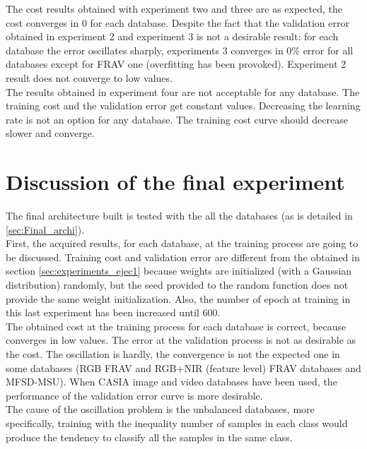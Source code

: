 The cost results obtained with experiment two and three are as expected, the cost converges in 0 for each database. Despite the fact that the validation error obtained in experiment 2 and experiment 3 is not a desirable result: for each database the error oscillates sharply, experiments 3 converges in 0\% error for all databases except for FRAV one (overfitting has been provoked). Experiment 2 result does not converge to low values.\\

The results obtained in experiment four are not acceptable for any database. The training cost and the validation error get constant values. Decreasing the learning rate is not an option for any database. The training cost curve should decrease slower and converge.\\

\section{Discussion of the final experiment}
The final architecture built is tested with the all the databases (as is detailed in \ref{sec:Final_archi}).\\

First, the acquired results, for each database, at the training process are going to be discussed. Training cost and validation error are different from the obtained in section \ref{sec:experiments_ejec1} because weights are initialized (with a Gaussian distribution) randomly, but the seed provided to the random function does not provide the same weight initialization. Also, the number of epoch at training in this last experiment has been increased until 600.\\

The obtained cost at the training process for each database is correct, because converges in low values. The error at the validation process is not as desirable as the cost. The oscillation is hardly, the convergence is not the expected one in some databases (RGB FRAV and RGB+NIR (feature level) FRAV databases and MFSD-MSU). When CASIA image and video databases have been used, the performance of the validation error curve is more desirable.\\

The cause of the oscillation problem is the unbalanced databases, more specifically, training with the inequality number of samples in each class would produce the tendency to classify all the samples in the same class.\\

